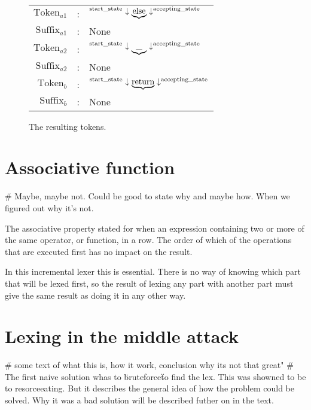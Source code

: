 \begin{example}
\begin{figure}[!h]
  \centering
  \begin{tabular}{r c l}
    $\text{Token}_{a1}$ & : & $\textsuperscript{start\_state} \downarrow
      \underbrace{ \text{else}} \downarrow ^{\text{accepting\_state} }$\\
    $\text{Suffix}_{a1}$ & : & None\\
    $\text{Token}_{a2}$ & : & $\textsuperscript{start\_state} \downarrow
      \underbrace{ \text{\_}} \downarrow ^{\text{accepting\_state} }$\\
    $\text{Suffix}_{a2}$ & : & None\\
    $\text{Token}_b$ & : & $\textsuperscript{start\_state} \downarrow
      \underbrace{ \text{return}} \downarrow ^{\text{accepting\_state}}$\\
    $\text{Suffix}_{b}$ & : & None
  \end{tabular}
  \caption{The resulting tokens.
    \label{fig.SepToken}}
\end{figure}

\end{example}


\section{Associative function}
\# Maybe, maybe not. Could be good to state why and maybe how. When we figured out why it's not.

The associative property stated for when an expression containing two or more of the same operator, or function, in a row. The order of which of the operations that are executed first has no impact on the result. 

In this incremental lexer this is essential. There is no way of knowing which part that will be lexed first, so the result of lexing any part with another part must give the same result as doing it in any other way.

\section{Lexing in the middle attack} %
\# some text of what this is, how it work, conclusion why its not that great" \#\\
The first naive solution whas to \"bruteforce\" to find the lex. This was showned to be to resorceeating. But it describes the general idea of how the problem could be solved. Why it was a bad solution will be described futher on in the text. 

